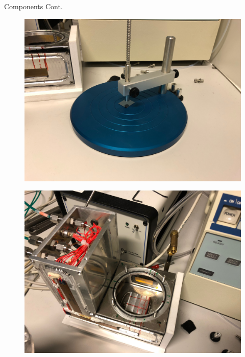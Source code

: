 \documentclass[10pt]{beamer}
\begin{document}
	\begin{frame}{Components Cont.}
	\begin{minipage}{0.47\textwidth}
	\begin{figure}
	\includegraphics[scale=0.04]{setup3.JPG}
	\end{figure}
	\end{minipage}
	\begin{minipage}{0.5\textwidth}
	\begin{figure}
	\includegraphics[scale=0.04]{setup4.JPG}
	\end{figure}
	\end{minipage}
	\end{frame}
	
\end{document}
